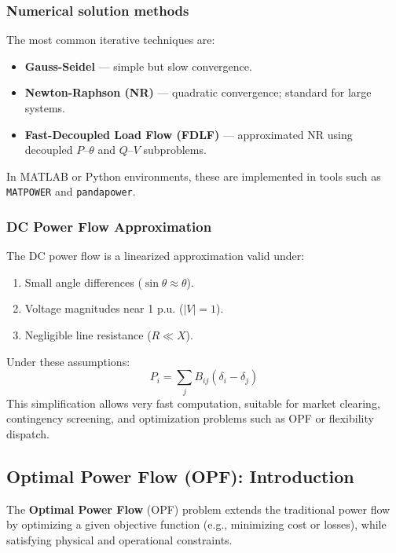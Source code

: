 \documentclass[11pt]{article}
\begin{document}
	\subsubsection*{Numerical solution methods}
	
	The most common iterative techniques are:
	\begin{itemize}
		\item \textbf{Gauss-Seidel} — simple but slow convergence.
		\item \textbf{Newton-Raphson (NR)} — quadratic convergence; standard for large systems.
		\item \textbf{Fast-Decoupled Load Flow (FDLF)} — approximated NR using decoupled $P$–$\theta$ and $Q$–$V$ subproblems.
	\end{itemize}
	
	In MATLAB or Python environments, these are implemented in tools such as \texttt{MATPOWER} \cite{zimmerman2011matpower} and \texttt{pandapower}.
	
	\subsubsection*{DC Power Flow Approximation}
	
	The DC power flow is a linearized approximation valid under:
	\begin{enumerate}
		\item Small angle differences ($\sin\theta \approx \theta$).
		\item Voltage magnitudes near 1 p.u. ($|V| = 1$).
		\item Negligible line resistance ($R \ll X$).
	\end{enumerate}
	
	Under these assumptions:
	\[
	P_i = \sum_{j} B_{ij} (\delta_i - \delta_j)
	\]
	This simplification allows very fast computation, suitable for market clearing, contingency screening, and optimization problems such as OPF or flexibility dispatch.
	
	\subsection{Optimal Power Flow (OPF): Introduction}
	
	The \textbf{Optimal Power Flow} (OPF) problem extends the traditional power flow by optimizing a given objective function (e.g., minimizing cost or losses), while satisfying physical and operational constraints.
	
\end{document}

